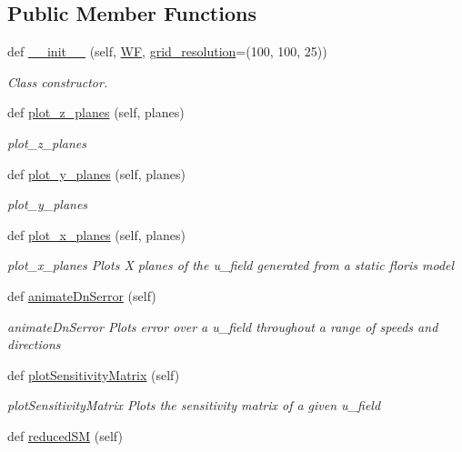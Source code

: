 \subsection*{Public Member Functions}
\begin{DoxyCompactItemize}
\item 
def \mbox{\hyperlink{classvisualization__manager___d_j_1_1_visualization_manager_ac262d79ceedca2ca4dd92b078a0851f1}{\+\_\+\+\_\+init\+\_\+\+\_\+}} (self, \mbox{\hyperlink{classvisualization__manager___d_j_1_1_visualization_manager_a56add1b450c7ecd758b096117f593578}{WF}}, \mbox{\hyperlink{classvisualization__manager___d_j_1_1_visualization_manager_ad5b8013f5cdf47f6384ae56186810e2b}{grid\+\_\+resolution}}=(100, 100, 25))
\begin{DoxyCompactList}\small\item\em Class constructor. \end{DoxyCompactList}\item 
def \mbox{\hyperlink{classvisualization__manager___d_j_1_1_visualization_manager_a05c519f1e0389278308ee046d27724cd}{plot\+\_\+z\+\_\+planes}} (self, planes)
\begin{DoxyCompactList}\small\item\em plot\+\_\+z\+\_\+planes \end{DoxyCompactList}\item 
def \mbox{\hyperlink{classvisualization__manager___d_j_1_1_visualization_manager_ab0047d9eeda14999bdf8f8de191d9a33}{plot\+\_\+y\+\_\+planes}} (self, planes)
\begin{DoxyCompactList}\small\item\em plot\+\_\+y\+\_\+planes \end{DoxyCompactList}\item 
def \mbox{\hyperlink{classvisualization__manager___d_j_1_1_visualization_manager_a4705f5926bdcecfd8d2d5aff434b2120}{plot\+\_\+x\+\_\+planes}} (self, planes)
\begin{DoxyCompactList}\small\item\em plot\+\_\+x\+\_\+planes Plots X planes of the u\+\_\+field generated from a static floris model \end{DoxyCompactList}\item 
def \mbox{\hyperlink{classvisualization__manager___d_j_1_1_visualization_manager_ab660449be49e49325d864dd1176e83f0}{animate\+Dn\+Serror}} (self)
\begin{DoxyCompactList}\small\item\em animate\+Dn\+Serror Plots error over a u\+\_\+field throughout a range of speeds and directions \end{DoxyCompactList}\item 
def \mbox{\hyperlink{classvisualization__manager___d_j_1_1_visualization_manager_a32793e43e3e04b3819dea7740e5b9ca1}{plot\+Sensitivity\+Matrix}} (self)
\begin{DoxyCompactList}\small\item\em plot\+Sensitivity\+Matrix Plots the sensitivity matrix of a given u\+\_\+field \end{DoxyCompactList}\item 
def \mbox{\hyperlink{classvisualization__manager___d_j_1_1_visualization_manager_a92c5f58eddce15c3fa19edd63e66ef43}{reduced\+SM}} (self)
\end{DoxyCompactItemize}
